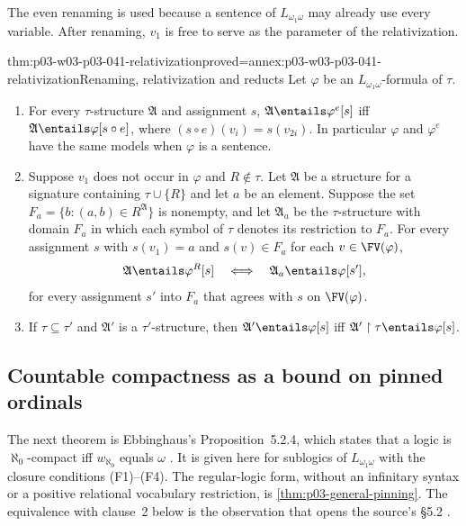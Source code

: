 The even renaming is used because a sentence of \(L_{\omega_1\omega}\)
may already use every variable. After renaming, \(v_1\) is free to serve
as the parameter of the relativization.

\begin{hblemma}{thm:p03-w03-p03-041-relativization}{proved=annex:p03-w03-p03-041-relativization}{Renaming, relativization and reducts}
Let \(\varphi\) be an \(L_{\omega_1\omega}\)-formula of \(\tau\).
\begin{enumerate}
\item For every \(\tau\)-structure \(\mathfrak A\) and assignment \(s\),
      \(\mathfrak A\entails\varphi^{e}[s]\) iff
      \(\mathfrak A\entails\varphi[s\circ e]\), where
      \((s\circ e)(v_i)=s(v_{2i})\). In particular \(\varphi\) and
      \(\varphi^{e}\) have the same models when \(\varphi\) is a sentence.
\item Suppose \(v_1\) does not occur in \(\varphi\) and \(R\notin\tau\).
      Let \(\mathfrak A\) be a structure for a signature containing
      \(\tau\cup\{R\}\) and let \(a\) be an element. Suppose the set
      \(F_a=\{b:(a,b)\in R^{\mathfrak A}\}\) is nonempty, and let
      \(\mathfrak A_a\) be the \(\tau\)-structure with domain \(F_a\)
      in which each symbol of \(\tau\) denotes its restriction to
      \(F_a\). For every assignment \(s\) with \(s(v_1)=a\) and
      \(s(v)\in F_a\) for each \(v\in\FV(\varphi)\),
      \[
       \mathfrak A\entails\varphi^{R}[s]
       \quad\Longleftrightarrow\quad
       \mathfrak A_a\entails\varphi[s'],
      \]
      for every assignment \(s'\) into \(F_a\) that agrees with \(s\) on
      \(\FV(\varphi)\).
\item If \(\tau\subseteq\tau'\) and \(\mathfrak A'\) is a
      \(\tau'\)-structure, then \(\mathfrak A'\entails\varphi[s]\) iff
      \(\mathfrak A'\restriction\tau\entails\varphi[s]\).
\end{enumerate}
\end{hblemma}

\subsection{Countable compactness as a bound on pinned ordinals}
\label{sec:p03-w03-p03-041-criterion}

The next theorem is Ebbinghaus's Proposition~5.2.4, which states that a
logic is \(\aleph_0\)-compact iff \(w_{\aleph_0}\) equals \(\omega\)
\cite[Ch.~II, Proposition~5.2.4, p.~62]{Ebbinghaus1985ExtendedLogics}.
It is given here for sublogics of \(L_{\omega_1\omega}\) with the closure
conditions (F1)--(F4). The regular-logic form, without an infinitary
syntax or a positive relational vocabulary restriction, is
\cref{thm:p03-general-pinning}. The equivalence with clause~2 below is
the observation that opens the
source's \S5.2 \cite[Ch.~II, p.~60]{Ebbinghaus1985ExtendedLogics}.

